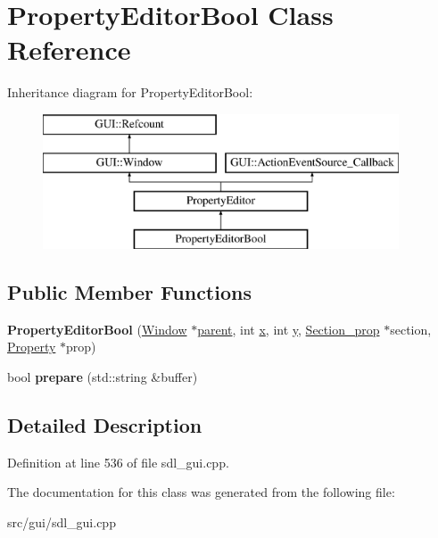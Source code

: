 \hypertarget{classPropertyEditorBool}{\section{Property\-Editor\-Bool Class Reference}
\label{classPropertyEditorBool}
}
Inheritance diagram for Property\-Editor\-Bool\-:\begin{figure}[H]
\begin{center}
\leavevmode
\includegraphics[height=4.000000cm]{classPropertyEditorBool}
\end{center}
\end{figure}
\subsection*{Public Member Functions}
\begin{DoxyCompactItemize}
\item 
\hypertarget{classPropertyEditorBool_a428b59bceb9e5d0c7fae949eb43511da}{{\bfseries Property\-Editor\-Bool} (\hyperlink{classGUI_1_1Window_ae828e9daa964dfc65a3550fb03117d30}{Window} $\ast$\hyperlink{classGUI_1_1Window_a2e593ff65e7702178d82fe9010a0b539}{parent}, int \hyperlink{classGUI_1_1Window_a6ca6a80ca00c9e1d8ceea8d3d99a657d}{x}, int \hyperlink{classGUI_1_1Window_a0ee8e923aff2c3661fc2e17656d37adf}{y}, \hyperlink{classSection__prop}{Section\-\_\-prop} $\ast$section, \hyperlink{classProperty}{Property} $\ast$prop)}\label{classPropertyEditorBool_a428b59bceb9e5d0c7fae949eb43511da}

\item 
\hypertarget{classPropertyEditorBool_a44c917ecde4468be2873d8580d5072ce}{bool {\bfseries prepare} (std\-::string \&buffer)}\label{classPropertyEditorBool_a44c917ecde4468be2873d8580d5072ce}

\end{DoxyCompactItemize}


\subsection{Detailed Description}


Definition at line 536 of file sdl\-\_\-gui.\-cpp.



The documentation for this class was generated from the following file\-:\begin{DoxyCompactItemize}
\item 
src/gui/sdl\-\_\-gui.\-cpp\end{DoxyCompactItemize}
